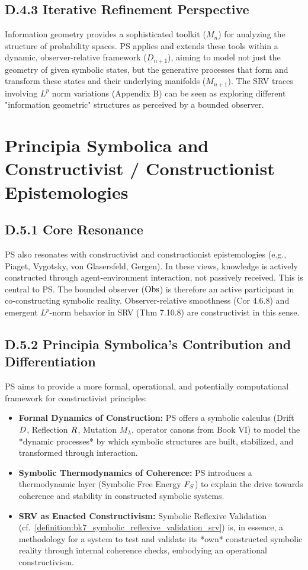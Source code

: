 \subsection*{D.4.3 Iterative Refinement Perspective}
\label{subsec:appD_info_geometry_iterative_refinement_perspective}
Information geometry provides a sophisticated toolkit (\(M_n\)) for analyzing the structure of probability spaces. PS applies and extends these tools within a dynamic, observer-relative framework (\(D_{n+1}\)), aiming to model not just the geometry of given symbolic states, but the generative processes that form and transform these states and their underlying manifolds (\(M_{n+1}\)). The SRV traces involving \(L^p\) norm variations (Appendix B) can be seen as exploring different "information geometric" structures as perceived by a bounded observer.
\section*{Principia Symbolica and Constructivist / Constructionist Epistemologies} \label{sec:appD_ps_and_constructivist_epistemologies}
\subsection*{D.5.1 Core Resonance}
\label{subsec:appD_constructivist_core_resonance}
PS also resonates with constructivist and constructionist epistemologies \cite{vonGlasersfeld1995} (e.g., Piaget, Vygotsky, von Glasersfeld, Gergen). In these views, knowledge is actively constructed through agent-environment interaction, not passively received. This is central to PS. The bounded observer (\(\mathrm{Obs}\)) is therefore an active participant in co-constructing symbolic reality. Observer-relative smoothness (Cor 4.6.8) and emergent \(L^p\)-norm behavior in SRV (Thm 7.10.8) are constructivist in this sense.
\subsection*{D.5.2 Principia Symbolica's Contribution and Differentiation} \label{subsec:appD_constructivist_contribution_differentiation}
PS aims to provide a more formal, operational, and potentially computational framework for constructivist principles:
\begin{itemize}
    \item \textbf{Formal Dynamics of Construction:} PS offers a symbolic calculus (Drift \(D\), Reflection \(R\), Mutation \(M_\lambda\), operator canons from Book VI) to model the *dynamic processes* by which symbolic structures are built, stabilized, and transformed through interaction.
    \item \textbf{Symbolic Thermodynamics of Coherence:} PS introduces a thermodynamic layer (Symbolic Free Energy \(F_S\)) to explain the drive towards coherence and stability in constructed symbolic systems.
    \item \textbf{SRV as Enacted Constructivism:} Symbolic Reflexive Validation (cf.~\ref{definition:bk7_symbolic_reflexive_validation_srv}) is, in essence, a methodology for a system to test and validate its *own* constructed symbolic reality through internal coherence checks, embodying an operational constructivism.
\end{itemize}
